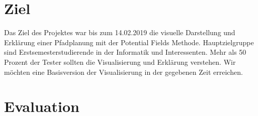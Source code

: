 






 \section{Ziel}
Das Ziel des Projektes war bis zum 14.02.2019 die visuelle Darstellung und Erklärung einer Pfadplanung mit der Potential Fields Methode. Hauptzielgruppe sind Erstsemesterstudierende in der Informatik und Interessenten. Mehr als 50 Prozent der Tester sollten die Visualisierung und Erklärung verstehen. Wir möchten eine Basisversion der Visualisierung in der gegebenen Zeit erreichen.


\section{Evaluation}

